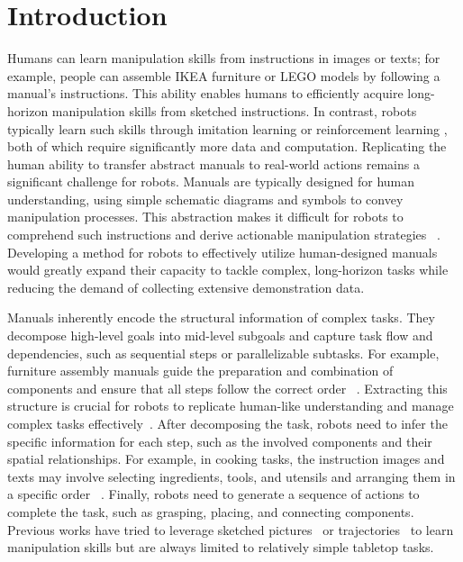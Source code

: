 \section{Introduction}
\label{sec:intro}
Humans can learn manipulation skills from instructions in images or texts; for example, people can assemble IKEA furniture or LEGO models by following a manual's instructions. 
This ability enables humans to efficiently acquire long-horizon manipulation skills from sketched instructions.
In contrast, robots typically learn such skills through imitation learning \cite{10602544} or reinforcement learning \cite{tang2024deep}, both of which require significantly more data and computation. 
Replicating the human ability to transfer abstract manuals to real-world actions remains a significant challenge for robots.
Manuals are typically designed for human understanding, using simple schematic diagrams and symbols to convey manipulation processes. This abstraction makes it difficult for robots to comprehend such instructions and derive actionable manipulation strategies ~\citep{liu2024ikea,wang2022ikea,wang2022translating}.
Developing a method for robots to effectively utilize human-designed manuals would greatly expand their capacity to tackle complex, long-horizon tasks while reducing the demand of collecting extensive demonstration data.

\clearpage


Manuals inherently encode the structural information of complex tasks. They decompose high-level goals into mid-level subgoals and capture task flow and dependencies, such as sequential steps or parallelizable subtasks.
For example, furniture assembly manuals guide the preparation and combination of components and ensure that all steps follow the correct order ~\citep{liu2024ikea}.
Extracting this structure is crucial for robots to replicate human-like understanding and manage complex tasks effectively~\citep{jiang2024roboexp,mo2019structurenet}. 
After decomposing the task, robots need to infer the specific information for each step, such as the involved components and their spatial relationships.
For example, in cooking tasks, the instruction images and texts may involve selecting ingredients, tools, and utensils and arranging them in a specific order ~\citep{shi2023robocook}.
Finally, robots need to generate a sequence of actions to complete the task, such as grasping, placing, and connecting components. 
Previous works have tried to leverage sketched pictures~\citep{sundaresan2024rt} or trajectories~\citep{gu2023rt} to learn manipulation skills but are always limited to relatively simple tabletop tasks.

